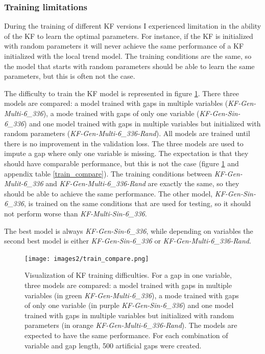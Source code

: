 \documentclass{article}
\begin{document}
\subsubsection{Training limitations}

During the training of different KF versions I experienced limitation in the ability of the KF to learn the optimal parameters. For instance, if the KF is initialized with random parameters it will never achieve the same performance of a KF initialized with the local trend model. The training conditions are the same, so the model that starts with random parameters should be able to learn the same parameters, but this is often not the case.

The difficulty to train the KF model is represented in figure \ref{fig:train_compare}.
There three models are compared: a model trained with gaps in multiple variables (\textit{KF-Gen-Multi-6\_336}), a mode trained with gaps of only one variable (\textit{KF-Gen-Sin-6\_336}) and one model trained with gaps in multiple variables but initialized with random parameters (\textit{KF-Gen-Multi-6\_336-Rand}).
All models are trained until there is no improvement in the validation loss. The three models are used to impute a gap where only one variable is missing.
The expectation is that they should have comparable performance, but this is not the case (figure \ref{fig:train_compare} and appendix table \ref{train_compare}). The training conditions between \textit{KF-Gen-Mulit-6\_336} and \textit{KF-Gen-Multi-6\_336-Rand} are exactly the same, so they should be able to achieve the same performance. The other model, \textit{KF-Gen-Sin-6\_336}, is trained on the same conditions that are used for testing, so it should not perform worse than \textit{KF-Multi-Sin-6\_336}.

The best model is always \textit{KF-Gen-Sin-6\_336}, while depending on variables the second best model is either \textit{KF-Gen-Sin-6\_336} or \textit{KF-Gen-Multi-6\_336-Rand}.



\begin{figure}
\centerline{\texttt{[image: images2/train\_compare.png]}}
\caption{Visualization of KF training difficulties. For a gap in one variable, three models are compared: a model trained with gaps in multiple variables (in green \textit{KF-Gen-Multi-6\_336}), a mode trained with gaps of only one variable (in purple \textit{KF-Gen-Sin-6\_336}) and one model trained with gaps in multiple variables but initialized with random parameters (in orange \textit{KF-Gen-Multi-6\_336-Rand}). The models are expected to have the same performance. For each combination of variable and gap length, 500 artificial gaps were created.}
\label{fig:train_compare}
\end{figure}
\end{document}
